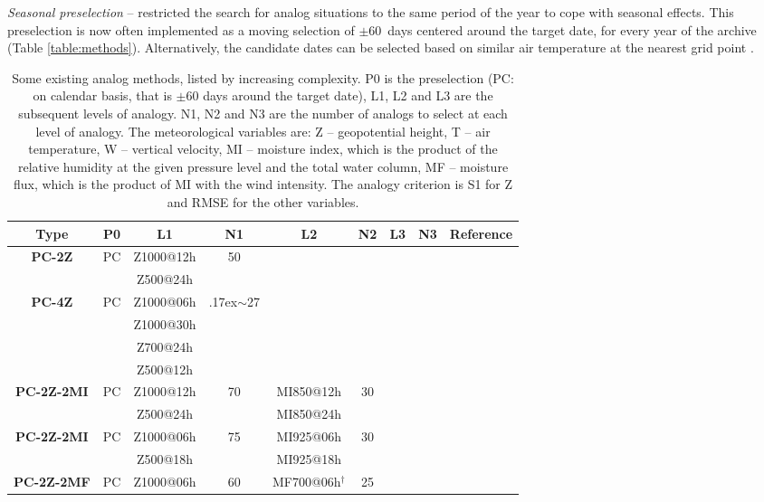 \documentclass[review]{elsarticle}
\begin{document}
\textit{Seasonal preselection} -- \citet{Lorenz1969} restricted the search for analog situations to the same period of the year to cope with seasonal effects. This preselection is now often implemented as a moving selection of $\pm$60~days centered around the target date, for every year of the archive (Table \ref{table:methods}). Alternatively, the candidate dates can be selected based on similar air temperature at the nearest grid point \citep[Table \ref{table:methods}][]{BenDaoud2016}.

\begin{table*}[h]
	\caption{Some existing analog methods, listed by increasing complexity. P0 is the preselection (PC: on calendar basis, that is $\pm 60$ days around the target date), L1, L2 and L3 are the subsequent levels of analogy. N1, N2 and N3 are the number of analogs to select at each level of analogy. The meteorological variables are: Z -- geopotential height, T -- air temperature, W -- vertical velocity, MI -- moisture index, which is the product of the relative humidity at the given pressure level and the total water column, MF -- moisture flux, which is the product of MI with the wind intensity. The analogy criterion is S1 for Z and RMSE for the other variables.}
	\begin{center}
		\begin{tabular}{ccccccccl}
			\hline
			\textbf{Type} & \textbf{P0} & \textbf{L1} & \textbf{N1} & \textbf{L2} & \textbf{N2} & \textbf{L3} & \textbf{N3} & \textbf{Reference} \\ 
			\hline 
			\textbf{PC-2Z} & PC & Z1000@12h & 50 &&&&& \citealt{Bontron2004} \\
			&& Z500@24h &&&&&& \\
			\hline 
			\textbf{PC-4Z} & PC & Z1000@06h & {\raise.17ex\hbox{$\scriptstyle\sim$}}27 &&&&& \citealt{Horton2018a} \\
			&& Z1000@30h &&&&&& \\
			&& Z700@24h &&&&&& \\
			&& Z500@12h &&&&&& \\
			\hline 
			\textbf{PC-2Z-2MI} & PC & Z1000@12h & 70 & MI850@12h & 30 &&& \citealt{Bontron2004} \\
			&& Z500@24h && MI850@24h &&&& \\
			\hline 
			\textbf{PC-2Z-2MI} & PC & Z1000@06h & 75 & MI925@06h & 30 &&& \citealt{Marty2010} \\
			&& Z500@18h && MI925@18h &&&& \\
			\hline 
			\textbf{PC-2Z-2MF} & PC & Z1000@06h & 60 & MF700@06h$^{\dagger}$ & 25 &&& \citealt{Marty2010} \\

\end{tabular}
\end{center}
\end{table*}
\end{document}
